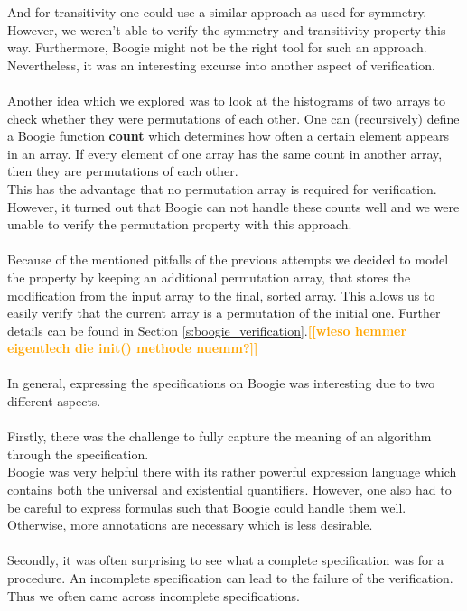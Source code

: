 \documentclass{report}
\newcommand{\todo}[1]{\textsf{\textbf{\textcolor{orange}{[[#1]]}}}}
\begin{document}
And for transitivity one could use a similar approach as used for symmetry.\\
However, we weren't able to verify the symmetry and transitivity property this way.
Furthermore, Boogie might not be the right tool for such an approach.
Nevertheless, it was an interesting excurse into another aspect of verification.
\\
\\
Another idea which we explored was to look at the histograms of two arrays to
check whether they were permutations of each other. One can (recursively) define a
Boogie function \textbf{count} which determines how often a certain element appears in an 
array. If every element of one array has the same count in another array, then they
are permutations of each other.\\
This has the advantage that no permutation array is required for verification.\\
However, it turned out that Boogie can not handle these counts well and we were
unable to verify the permutation property with this approach.
\\
\\
Because of the mentioned pitfalls of the previous attempts we decided to model the property by keeping an additional permutation array, that stores the modification from the input array to the final, sorted array. This allows us to easily verify that the current array is a permutation of the initial one. Further details can be found in Section \ref{s:boogie_verification}.\todo{wieso hemmer eigentlech die init() methode nuemm?}
\\\\
In general, expressing the specifications on Boogie was interesting due to two different aspects.
\\
\\
Firstly, there was the challenge to fully capture the meaning of an algorithm
through the specification.\\
Boogie was very helpful there with its rather powerful expression language which
contains both the universal and existential quantifiers.
However, one also had to be careful to express formulas such that Boogie could
handle them well. Otherwise, more annotations are necessary which is less desirable.
\\
\\
Secondly, it was often surprising to see what a complete specification was for a procedure.
An incomplete specification can lead to the failure of the verification.
Thus we often came across incomplete specifications.\\
\end{document}

